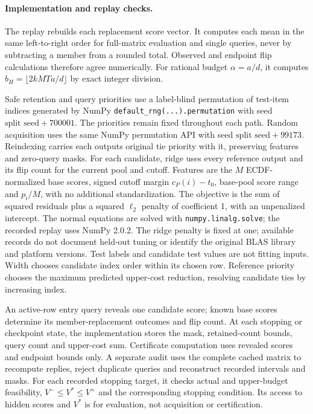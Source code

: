 \paragraph{Implementation and replay checks.}
The replay rebuilds each replacement score vector. It computes each mean in the same left-to-right order for full-matrix evaluation and single queries, never by subtracting a member from a rounded total. Observed and endpoint flip calculations therefore agree numerically. For rational budget $\alpha=a/d$, it computes $b_H=\lfloor2kMTa/d\rfloor$ by exact integer division.

Safe retention and query priorities use a label-blind permutation of test-item indices generated by NumPy \texttt{default\_rng(...).permutation} with seed $\text{split seed}+700001$. The priorities remain fixed throughout each path. Random acquisition uses the same NumPy permutation API with seed $\text{split seed}+99173$.  Reindexing carries each output\textquotesingle s original tie priority with it, preserving features and zero-query masks. For each candidate, ridge uses every reference output and its flip count for the current pool and cutoff. Features are the $M$ ECDF-normalized base scores, signed cutoff margin $c_P(i)-t_0$, base-pool score range and $p_i/M$, with no additional standardization. The objective is the sum of squared residuals plus a squared $\ell_2$ penalty of coefficient 1, with an unpenalized intercept. The normal equations are solved with \texttt{numpy.linalg.solve}; the recorded replay uses NumPy 2.0.2. The ridge penalty is fixed at one; available records do not document held-out tuning or identify the original BLAS library and platform versions. Test labels and candidate test values are not fitting inputs. Width chooses candidate index order within its chosen row. Reference priority chooses the maximum predicted upper-cost reduction, resolving candidate ties by increasing index.

An active-row entry query reveals one candidate score; known base scores determine its member-replacement outcomes and flip count. At each stopping or checkpoint state, the implementation stores the mask, retained-count bounds, query count and upper-cost sum. Certificate computation uses revealed scores and endpoint bounds only. A separate audit uses the complete cached matrix to recompute replies, reject duplicate queries and reconstruct recorded intervals and masks. For each recorded stopping target, it checks actual and upper-budget feasibility, $V^-\le V^*\le V^+$ and the corresponding stopping condition. Its access to hidden scores and $V^*$ is for evaluation, not acquisition or certification.

